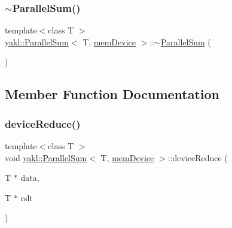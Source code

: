 \mbox{\label{classyakl_1_1ParallelSum_3_01T_00_01memDevice_01_4_a8f8e427629815ea8cdd1464dcd48648a}} 
\subsubsection{\texorpdfstring{$\sim$\+Parallel\+Sum()}{~ParallelSum()}}
{\footnotesize\ttfamily template$<$class T $>$ \\
\hyperlink{classyakl_1_1ParallelSum}{yakl\+::\+Parallel\+Sum}$<$ T, \hyperlink{namespaceyakl_ac3c32aec58c61e7f870081477ceee883}{mem\+Device} $>$\+::$\sim$\hyperlink{classyakl_1_1ParallelSum}{Parallel\+Sum} (\begin{DoxyParamCaption}{ }\end{DoxyParamCaption})\hspace{0.3cm}{\ttfamily [inline]}}



\subsection{Member Function Documentation}
\mbox{\label{classyakl_1_1ParallelSum_3_01T_00_01memDevice_01_4_a7db2870334f8252762d24d0da60e69fa}} 
\subsubsection{\texorpdfstring{device\+Reduce()}{deviceReduce()}}
{\footnotesize\ttfamily template$<$class T $>$ \\
void \hyperlink{classyakl_1_1ParallelSum}{yakl\+::\+Parallel\+Sum}$<$ T, \hyperlink{namespaceyakl_ac3c32aec58c61e7f870081477ceee883}{mem\+Device} $>$\+::device\+Reduce (\begin{DoxyParamCaption}\item[{T $\ast$}]{data,  }\item[{T $\ast$}]{rslt }\end{DoxyParamCaption})\hspace{0.3cm}{\ttfamily [inline]}}

